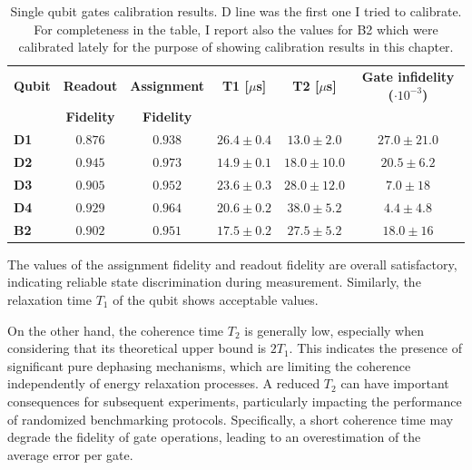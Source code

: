 \begin{table}[h]
    \centering
    \begin{tabular}{lccccc}
    \toprule
    \textbf{Qubit} & \multicolumn{1}{c}{\textbf{Readout}} & \multicolumn{1}{c}{\textbf{Assignment}} & \textbf{T1 [$\mu$s]} & \textbf{T2 [$\mu$s]} & \textbf{Gate infidelity ($\cdot 10^{-3}$)} \\
    \textbf{} & \textbf{Fidelity} & \textbf{Fidelity} & & & \\
    \midrule
    \textbf{D1} & $0.876$ & $0.938$ & $26.4 \pm 0.4$ & $13.0 \pm 2.0$ & $27.0 \pm 21.0$ \\
    \textbf{D2} & $0.945$ & $0.973$ & $14.9 \pm 0.1$ & $18.0 \pm 10.0$ & $20.5 \pm 6.2$ \\
    \textbf{D3} & $0.905$ & $0.952$ & $23.6 \pm 0.3$ & $28.0 \pm 12.0$ & $7.0 \pm 18$ \\
    \textbf{D4} & $0.929$ & $0.964$ & $20.6 \pm 0.2$ & $38.0 \pm 5.2$ & $4.4 \pm 4.8$ \\
    \textbf{B2} & $0.902$ & $0.951$ & $17.5 \pm 0.2$ & $27.5 \pm 5.2$ & $18.0 \pm 16$ \\
    \bottomrule
    \end{tabular}
    \caption{Single qubit gates calibration results. D line was the first one I tried to calibrate.\\
    For completeness in the table, I report also the values for B2 which were calibrated lately for the purpose of showing calibration results in this chapter.}
    \label{tab:cal_results}
\end{table}

The values of the assignment fidelity and readout fidelity are overall satisfactory, indicating reliable state discrimination during measurement. 
Similarly, the relaxation time $T_1$ of the qubit shows acceptable values.

On the other hand, the coherence time $T_2$ is generally low, especially when considering that its theoretical upper bound is $2T_1$. 
This indicates the presence of significant pure dephasing mechanisms, which are limiting the coherence independently of energy relaxation processes. 
A reduced $T_2$ can have important consequences for subsequent experiments, particularly impacting the performance of randomized benchmarking protocols. 
Specifically, a short coherence time may degrade the fidelity of gate operations, leading to an overestimation of the average error per gate.

